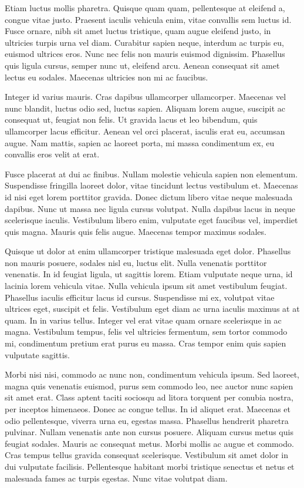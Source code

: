\documentclass{article}
\begin{document}
	Etiam luctus mollis pharetra. Quisque quam quam, pellentesque at eleifend a, congue vitae justo. Praesent iaculis vehicula enim, vitae convallis sem luctus id. Fusce ornare, nibh sit amet luctus tristique, quam augue eleifend justo, in ultricies turpis urna vel diam. Curabitur sapien neque, interdum ac turpis eu, euismod ultrices eros. Nunc nec felis non mauris euismod dignissim. Phasellus quis ligula cursus, semper nunc ut, eleifend arcu. Aenean consequat sit amet lectus eu sodales. Maecenas ultricies non mi ac faucibus.
	
	Integer id varius mauris. Cras dapibus ullamcorper ullamcorper. Maecenas vel nunc blandit, luctus odio sed, luctus sapien. Aliquam lorem augue, suscipit ac consequat ut, feugiat non felis. Ut gravida lacus et leo bibendum, quis ullamcorper lacus efficitur. Aenean vel orci placerat, iaculis erat eu, accumsan augue. Nam mattis, sapien ac laoreet porta, mi massa condimentum ex, eu convallis eros velit at erat.
	
	Fusce placerat at dui ac finibus. Nullam molestie vehicula sapien non elementum. Suspendisse fringilla laoreet dolor, vitae tincidunt lectus vestibulum et. Maecenas id nisi eget lorem porttitor gravida. Donec dictum libero vitae neque malesuada dapibus. Nunc ut massa nec ligula cursus volutpat. Nulla dapibus lacus in neque scelerisque iaculis. Vestibulum libero enim, vulputate eget faucibus vel, imperdiet quis magna. Mauris quis felis augue. Maecenas tempor maximus sodales.
	
	Quisque ut dolor at enim ullamcorper tristique malesuada eget dolor. Phasellus non mauris posuere, sodales nisl eu, luctus elit. Nulla venenatis porttitor venenatis. In id feugiat ligula, ut sagittis lorem. Etiam vulputate neque urna, id lacinia lorem vehicula vitae. Nulla vehicula ipsum sit amet vestibulum feugiat. Phasellus iaculis efficitur lacus id cursus. Suspendisse mi ex, volutpat vitae ultrices eget, suscipit et felis. Vestibulum eget diam ac urna iaculis maximus at at quam. In in varius tellus. Integer vel erat vitae quam ornare scelerisque in ac magna. Vestibulum tempus, felis vel ultricies fermentum, sem tortor commodo mi, condimentum pretium erat purus eu massa. Cras tempor enim quis sapien vulputate sagittis.
	
	Morbi nisi nisi, commodo ac nunc non, condimentum vehicula ipsum. Sed laoreet, magna quis venenatis euismod, purus sem commodo leo, nec auctor nunc sapien sit amet erat. Class aptent taciti sociosqu ad litora torquent per conubia nostra, per inceptos himenaeos. Donec ac congue tellus. In id aliquet erat. Maecenas et odio pellentesque, viverra urna eu, egestas massa. Phasellus hendrerit pharetra pulvinar. Nullam venenatis ante non cursus posuere. Aliquam cursus metus quis feugiat sodales. Mauris ac consequat metus. Morbi mollis ac augue et commodo. Cras tempus tellus gravida consequat scelerisque. Vestibulum sit amet dolor in dui vulputate facilisis. Pellentesque habitant morbi tristique senectus et netus et malesuada fames ac turpis egestas. Nunc vitae volutpat diam.
\end{document}
